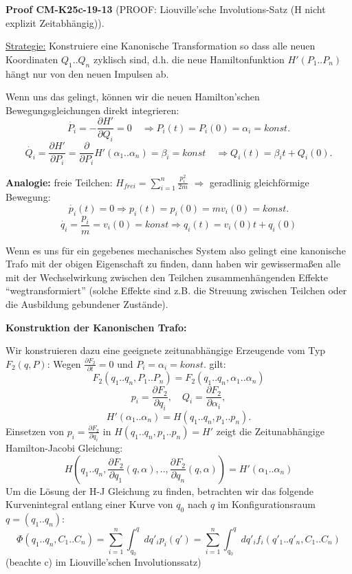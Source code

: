 \documentclass[10pt, letterpaper]{article}
\newcommand{\CustomHeading}[3]{%
  \par\medskip\noindent%
  \textbf{#1 #2} \textnormal{(#3)}.\enskip%
}
\newenvironment{PROOF}[2]{\CustomHeading{Proof}{#1}{#2}}{}
\begin{document}
\begin{PROOF}{CM-K25c-19-13}{PROOF: Liouville'sche Involutions-Satz (H nicht explizit Zeitabhängig)}
\underline{Strategie:} Konstruiere eine Kanonische Transformation so dass alle neuen Koordinaten $Q_1..Q_n$ zyklisch sind, d.h. die neue Hamiltonfunktion $H'(P_1..P_n)$ hängt nur von den neuen Impulsen ab.

Wenn uns das gelingt, können wir die neuen Hamilton'schen Bewegungsgleichungen direkt integrieren:
\[
\dot{P_i} = -\frac{\partial H'}{\partial Q_i} = 0 \quad \Rightarrow P_i(t) = P_i(0) = \alpha_i = konst.
\]
\[
\dot{Q_i} = \frac{\partial H'}{\partial P_i} = \frac{\partial}{\partial P_i}H'(\alpha_1..\alpha_n) = \beta_i = konst \quad \Rightarrow Q_i(t) = \beta_it + Q_i(0).
\]


\textbf{Analogie:} freie Teilchen: $H_{frei} = \sum_{i=1}^n \frac{p_i^2}{2m}$
$\Rightarrow$ geradlinig gleichförmige Bewegung:
\[
\dot{p_i}(t) = 0 \Rightarrow p_i(t) = p_i(0) = mv_i(0) = konst.
\]
\[
\dot{q_i} = \frac{p_i}{m} = v_i(0) = konst \Rightarrow q_i(t) = v_i(0)t + q_i(0)
\]

Wenn es uns für ein gegebenes mechanisches System also gelingt eine kanonische Trafo mit der obigen Eigenschaft zu finden, dann haben wir gewissermaßen alle mit der Wechselwirkung zwischen den Teilchen zusammenhängenden Effekte ``wegtransformiert'' (solche Effekte sind z.B. die Streuung zwischen Teilchen oder die Ausbildung gebundener Zustände).


\textbf{Konstruktion der Kanonischen Trafo:}

Wir konstruieren dazu eine geeignete zeitunabhängige Erzeugende vom Typ $F_2(q,P)$: Wegen $\frac{\partial F_2}{\partial t} = 0$ und $P_i = \alpha_i = konst.$ gilt:
\[
F_2(q_1..q_n,P_1..P_n) = F_2(q_1..q_n,\alpha_1..\alpha_n)
\]
\[
p_i = \frac{\partial F_2}{\partial q_i}, \quad Q_i = \frac{\partial F_2}{\partial \alpha_i},
\]
\[
H'(\alpha_1..\alpha_n) = H(q_1..q_n,p_1..p_n).
\]
Einsetzen von $p_i = \frac{\partial F_2}{\partial q_i}$ in $H(q_1..q_n,p_1..p_n) = H'$ zeigt die Zeitunabhängige Hamilton-Jacobi Gleichung: 
\[
H(q_1..q_n, \frac{\partial F_2}{\partial q_1}(q,\alpha),..,\frac{\partial F_2}{\partial q_n}(q,\alpha)) = H'(\alpha_1..\alpha_n)
\]
\noindent
Um die Lösung der H-J Gleichung zu finden, betrachten wir das folgende Kurvenintegral entlang einer Kurve von $q_0$ nach $q$ im Konfigurationsraum $q=(q_1..q_n)$:
\[
\Phi(q_1..q_n,C_1..C_n) = \sum_{i=1}^n \int_{q_0}^q dq'_i p_i(q') = \sum_{i=1}^n \int_{q_0}^q dq'_i f_i(q'_1..q'_n,C_1..C_n)
\]
(beachte c) im Liouville'schen Involutionssatz)


\end{PROOF}
\end{document}
